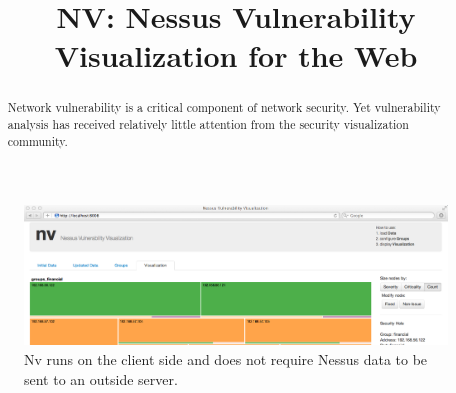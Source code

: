 \documentclass{acm_proc_article-sp}
\begin{document}
\title{NV: Nessus Vulnerability Visualization for the Web}


\author{
}

\maketitle
\begin{abstract}

Network vulnerability is a critical component of network security. 
Yet vulnerability analysis has received relatively little attention from the security visualization community.  

\end{abstract}




\begin{figure}
  \centering
  \includegraphics[width=1.0\textwidth]{../screenshots/overview_new_cropped}
  \caption{Nv runs on the client side and does not require Nessus data to be sent to an outside server.}
\end{figure}
\end{document}
